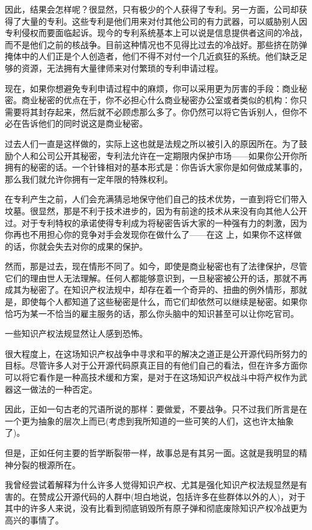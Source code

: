 因此，结果会怎样呢？很显然，只有极少的个人获得了专利。另一方面，公司却获得了大量的专利。这些专利是他们用来对付其他公司的有力武器，可以威胁别人因专利侵权而要面临起诉。现今的专利系统基本上可以说是信息提供者这间的冷战，而不是他们之前的核战争。目前这种情况也不见得比过去的冷战好。那些挤在防弹掩体中的人们正是个人创造者，他们不得不对付一个几近疯狂的系统。他们缺乏足够的资源，无法拥有大量律师来对付繁琐的专利申请过程。

现在，如果你想避免专利申请过程中的麻烦，你可以采用更为厉害的手段：商业秘密。商业秘密的优点在于，你不必担心什么商业秘密办公室或者类似的机构：你只需要将其封存起来，然后就不必顾虑那么多了。你仍然可以将它告诉别人，但你不必在告诉他们的同时说这是商业秘密。

过去人们一直是这样做的，实际上这也就是法规之所以被引入的原因所在。为了鼓励个人和公司公开其秘密，专利法允许在一定期限内保护市场——如果你公开你所拥有的秘密的话。一个针锋相对的基本形式是：你告诉大家你是如何做成某事的，那么我们就允许你拥有一定年限的特殊权利。

在专利产生之前，人们会充满猜忌地保守他们自己的技术优势，一直到将它们带入坟墓。很显然，那是不利于技术进步的，因为有前途的技术从来没有向其他人公开过。对于专利特权的承诺使得专利成为将秘密告诉大家的一种强有力的刺激，因为你再也不用担心你的竞争对手会发现你在做什么了——在这 上，如果你不这样做的话，你就会失去对你的成果的保护。

然而，那是过去，现在情形不同了。如今，即使是商业秘密也有了法律保护，尽管它们的理由世人无法理解。任何人都能够意识到，一旦秘密被公开的话，那就不再成其为秘密了。在知识产权法规中，却存在着一个奇异的、扭曲的例外情形，那就是，即使每个人都知道了这些秘密是什么，而它们却依然可以继续是秘密。如果你恰巧为某一不恰当的雇主服务的话，那么你头脑中的知识甚至可以让你吃官司。

一些知识产权法规显然让人感到恐怖。

很大程度上，在这场知识产权战争中寻求和平的解决之道正是公开源代码所努力的目标。尽管许多人对于公开源代码原真正目的有他们自己的看法，但在许多方面你可以将它看作是一种高技术缓和方案，是对于在这场知识产权战斗中将产权作为武器这一做法的一种否定。

因此，正如一句古老的咒语所说的那样：要做爱，不要战争。只不过我们所言是在一个更为抽象的层次上而已(考虑到我所知道的一些可笑的人们，这也许太抽象了)。

但是，正如任何主要的哲学断裂带一样，故事总是有其另一面。这就是我明显的精神分裂的根源所在。

我曾经尝试着解释为什么许多人觉得知识产权、尤其是强化知识产权法规显然是有害的。在赞成公开源代码的人群中(坦白地说，包括许多在些群体以外的人)，对于其中的许多人来说，没有比看到彻底销毁所有原子弹和彻底废除知识产权冷战更为高兴的事情了。

